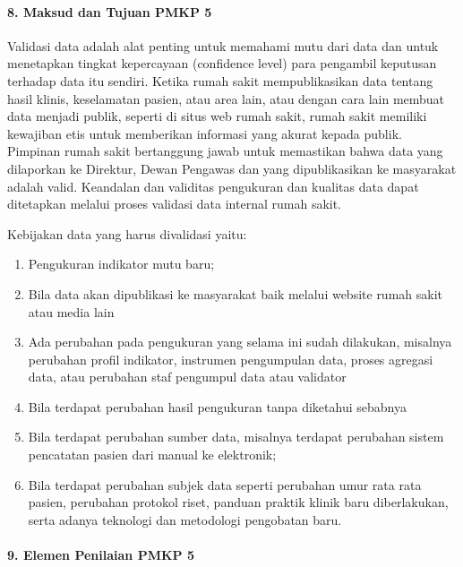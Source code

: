 \documentclass[
]{book}
\providecommand{\tightlist}{%
  \setlength{\itemsep}{0pt}\setlength{\parskip}{0pt}}
\begin{document}
\hypertarget{maksud-dan-tujuan-pmkp-5}{%
\paragraph*{8. Maksud dan Tujuan PMKP 5}\label{maksud-dan-tujuan-pmkp-5}}

Validasi data adalah alat penting untuk memahami mutu dari data dan untuk menetapkan tingkat kepercayaan (confidence level) para pengambil keputusan terhadap data itu sendiri. Ketika rumah sakit mempublikasikan data tentang hasil klinis, keselamatan pasien, atau area lain, atau dengan cara lain membuat data menjadi publik, seperti di situs web rumah sakit, rumah sakit memiliki kewajiban etis untuk memberikan informasi yang akurat kepada publik. Pimpinan rumah sakit bertanggung jawab untuk memastikan bahwa data yang dilaporkan ke Direktur, Dewan Pengawas dan yang dipublikasikan ke masyarakat adalah valid. Keandalan dan validitas pengukuran dan kualitas data dapat ditetapkan melalui proses validasi data internal rumah sakit.

Kebijakan data yang harus divalidasi yaitu:

\begin{enumerate}
\def\labelenumi{\alph{enumi}.}
\tightlist
\item
  Pengukuran indikator mutu baru;
\item
  Bila data akan dipublikasi ke masyarakat baik melalui
  website rumah sakit atau media lain
\item
  Ada perubahan pada pengukuran yang selama ini sudah dilakukan, misalnya perubahan profil indikator, instrumen pengumpulan data, proses agregasi data, atau perubahan staf pengumpul data atau validator
\item
  Bila terdapat perubahan hasil pengukuran tanpa diketahui sebabnya
\item
  Bila terdapat perubahan sumber data, misalnya terdapat perubahan sistem pencatatan pasien dari manual ke elektronik;
\item
  Bila terdapat perubahan subjek data seperti perubahan umur rata rata pasien, perubahan protokol riset, panduan praktik klinik baru diberlakukan, serta adanya teknologi dan metodologi pengobatan baru.
\end{enumerate}

\hypertarget{elemen-penilaian-pmkp-5}{%
\paragraph*{9. Elemen Penilaian PMKP 5}\label{elemen-penilaian-pmkp-5}}
\end{document}
